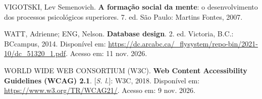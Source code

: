 \begin{referenciasIFTO}
VIGOTSKI, Lev Semenovich. \textbf{A formação social da mente}: o desenvolvimento dos processos psicológicos superiores. 7. ed. São Paulo: Martins Fontes, 2007.

WATT, Adrienne; ENG, Nelson. \textbf{Database design}. 2. ed. Victoria, B.C.: BCcampus, 2014. Disponível em: \url{https://dc.arcabc.ca/_flysystem/repo-bin/2021-10/dc_51320_1.pdf}. Acesso em: 11 nov. 2026.

WORLD WIDE WEB CONSORTIUM (W3C). \textbf{Web Content Accessibility Guidelines (WCAG) 2.1}. [\textit{S. l.}]: W3C, 2018. Disponível em: \url{https://www.w3.org/TR/WCAG21/}. Acesso em: 9 nov. 2026.

\end{referenciasIFTO}
